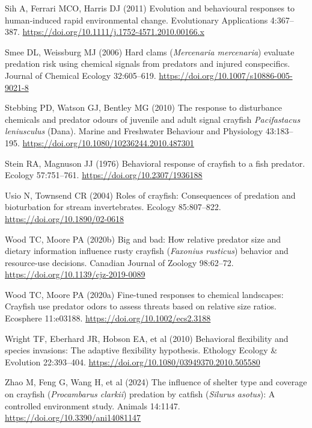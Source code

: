 \documentclass[
  letterpaper,
  DIV=11,
  numbers=noendperiod]{scrartcl}
\newlength{\cslhangindent}
\newenvironment{CSLReferences}[2] %
 {\begin{list}{}{%
  \setlength{\itemindent}{0pt}
  \setlength{\leftmargin}{0pt}
  \setlength{\parsep}{0pt}
  \ifodd #1
   \setlength{\leftmargin}{\cslhangindent}
   \setlength{\itemindent}{-1\cslhangindent}
  \fi
  \setlength{\itemsep}{#2\baselineskip}}}
 {\end{list}}
\begin{document}
\begin{CSLReferences}{1}{1}
Sih A, Ferrari MCO, Harris DJ (2011) Evolution and behavioural responses
to human‐induced rapid environmental change. Evolutionary Applications
4:367--387. \url{https://doi.org/10.1111/j.1752-4571.2010.00166.x}

Smee DL, Weissburg MJ (2006) Hard clams ({\emph{Mercenaria mercenaria}})
evaluate predation risk using chemical signals from predators and
injured conspecifics. Journal of Chemical Ecology 32:605--619.
\url{https://doi.org/10.1007/s10886-005-9021-8}

Stebbing PD, Watson GJ, Bentley MG (2010) The response to disturbance
chemicals and predator odours of juvenile and adult signal crayfish
{\emph{Pacifastacus leniusculus}} ({Dana}). Marine and Freshwater
Behaviour and Physiology 43:183--195.
\url{https://doi.org/10.1080/10236244.2010.487301}

Stein RA, Magnuson JJ (1976) Behavioral response of crayfish to a fish
predator. Ecology 57:751--761. \url{https://doi.org/10.2307/1936188}

Usio N, Townsend CR (2004) Roles of crayfish: Consequences of predation
and bioturbation for stream invertebrates. Ecology 85:807--822.
\url{https://doi.org/10.1890/02-0618}

Wood TC, Moore PA (2020b) Big and bad: How relative predator size and
dietary information influence rusty crayfish ({\emph{Faxonius
rusticus}}) behavior and resource-use decisions. Canadian Journal of
Zoology 98:62--72. \url{https://doi.org/10.1139/cjz-2019-0089}

Wood TC, Moore PA (2020a) Fine-tuned responses to chemical landscapes:
Crayfish use predator odors to assess threats based on relative size
ratios. Ecosphere 11:e03188. \url{https://doi.org/10.1002/ecs2.3188}

Wright TF, Eberhard JR, Hobson EA, et al (2010) Behavioral flexibility
and species invasions: The adaptive flexibility hypothesis. Ethology
Ecology \& Evolution 22:393--404.
\url{https://doi.org/10.1080/03949370.2010.505580}

Zhao M, Feng G, Wang H, et al (2024) The influence of shelter type and
coverage on crayfish ({\emph{Procambarus clarkii}}) predation by catfish
({\emph{Silurus asotus}}): A controlled environment study. Animals
14:1147. \url{https://doi.org/10.3390/ani14081147}

\end{CSLReferences}
\end{document}
